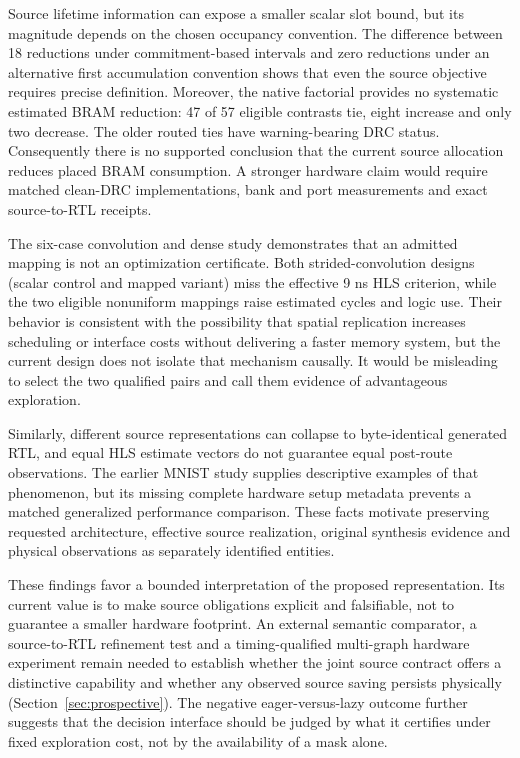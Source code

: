 \documentclass{article}
\begin{document}
Source lifetime information can expose a smaller scalar slot bound, but its magnitude depends on the chosen occupancy convention. The difference between 18 reductions under commitment-based intervals and zero reductions under an alternative first accumulation convention shows that even the source objective requires precise definition. Moreover, the native factorial provides no systematic estimated BRAM reduction: 47 of 57 eligible contrasts tie, eight increase and only two decrease. The older routed ties have warning-bearing DRC status. Consequently there is no supported conclusion that the current source allocation reduces placed BRAM consumption. A stronger hardware claim would require matched clean-DRC implementations, bank and port measurements and exact source-to-RTL receipts.


The six-case convolution and dense study demonstrates that an admitted mapping is not an optimization certificate. Both strided-convolution designs (scalar control and mapped variant) miss the effective 9 ns HLS criterion, while the two eligible nonuniform mappings raise estimated cycles and logic use. Their behavior is consistent with the possibility that spatial replication increases scheduling or interface costs without delivering a faster memory system, but the current design does not isolate that mechanism causally. It would be misleading to select the two qualified pairs and call them evidence of advantageous exploration.

Similarly, different source representations can collapse to byte-identical generated RTL, and equal HLS estimate vectors do not guarantee equal post-route observations. The earlier MNIST study supplies descriptive examples of that phenomenon, but its missing complete hardware setup metadata prevents a matched generalized performance comparison. These facts motivate preserving requested architecture, effective source realization, original synthesis evidence and physical observations as separately identified entities.


These findings favor a bounded interpretation of the proposed representation. Its current value is to make source obligations explicit and falsifiable, not to guarantee a smaller hardware footprint. An external semantic comparator, a source-to-RTL refinement test and a timing-qualified multi-graph hardware experiment remain needed to establish whether the joint source contract offers a distinctive capability and whether any observed source saving persists physically (Section~\ref{sec:prospective}). The negative eager-versus-lazy outcome further suggests that the decision interface should be judged by what it certifies under fixed exploration cost, not by the availability of a mask alone.
\end{document}
